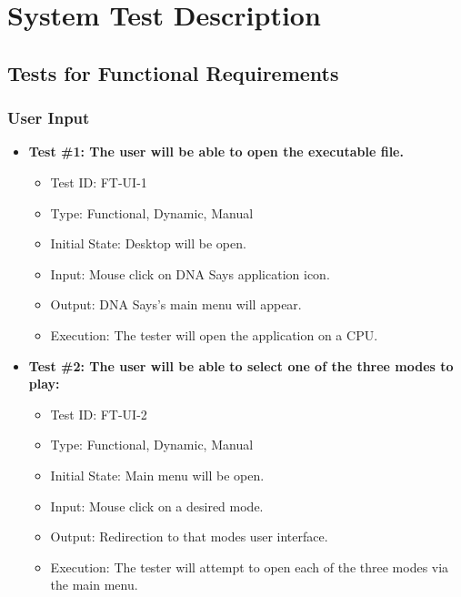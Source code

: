 \documentclass[12pt, titlepage]{article}
\begin{document}
\section{System Test Description}
	
\subsection{Tests for Functional Requirements}

\subsubsection{User Input}
		
\begin{itemize}

\item \textbf{Test \#1: The user will be able to open the executable file.}
\begin{itemize}
\item Test ID: FT-UI-1
\item Type: Functional, Dynamic, Manual		
\item Initial State: Desktop will be open. 					
\item Input: Mouse click on DNA Says application icon. 					
\item Output: DNA Says's main menu will appear. 					
\item Execution: The tester will open the application on a CPU.
\end{itemize}
					
\item \textbf{Test \#2: The user will be able to select one of the three modes to play:} 
\begin{itemize}
\item Test ID: FT-UI-2
\item Type: Functional, Dynamic, Manual 		
\item Initial State: Main menu will be open. 					
\item Input: Mouse click on a desired mode. 					
\item Output: Redirection to that modes user interface.					
\item Execution: The tester will attempt to open each of the three modes via the main menu.
\end{itemize}


\end{itemize}
\end{document}

